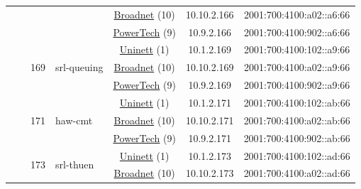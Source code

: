 \begin{small}
\begin{center}
\begin{longtable}{|c|c|c|c|c|c|c|c|}
  &  &  &  & \multicolumn{2}{|c|}{\tiny{\href{https://www.broadnet.no}{Broadnet} (10)}} & \tiny{10.10.2.166} & \tiny{2001:700:4100:a02::a6:66} \\* \cline{5-5}\cline{6-6}\cline{7-7}\cline{8-8}
  &  &  &  & \multicolumn{2}{|c|}{\tiny{\href{http://www.powertech.no}{PowerTech} (9)}} & \tiny{10.9.2.166} & \tiny{2001:700:4100:902::a6:66} \\* \cline{3-3}\cline{4-4}\cline{5-5}\cline{6-6}\cline{7-7}\cline{8-8}
  &  & \multirow{3}{*}{\tiny{169}} & \multicolumn{1}{|l|}{\multirow{3}{*}{\tiny{srl-queuing}}} & \multicolumn{2}{|c|}{\tiny{\href{https://www.uninett.no}{Uninett} (1)}} & \tiny{10.1.2.169} & \tiny{2001:700:4100:102::a9:66} \\* \cline{5-5}\cline{6-6}\cline{7-7}\cline{8-8}
  &  &  &  & \multicolumn{2}{|c|}{\tiny{\href{https://www.broadnet.no}{Broadnet} (10)}} & \tiny{10.10.2.169} & \tiny{2001:700:4100:a02::a9:66} \\* \cline{5-5}\cline{6-6}\cline{7-7}\cline{8-8}
  &  &  &  & \multicolumn{2}{|c|}{\tiny{\href{http://www.powertech.no}{PowerTech} (9)}} & \tiny{10.9.2.169} & \tiny{2001:700:4100:902::a9:66} \\* \cline{3-3}\cline{4-4}\cline{5-5}\cline{6-6}\cline{7-7}\cline{8-8}
  &  & \multirow{3}{*}{\tiny{171}} & \multicolumn{1}{|l|}{\multirow{3}{*}{\tiny{haw-cmt}}} & \multicolumn{2}{|c|}{\tiny{\href{https://www.uninett.no}{Uninett} (1)}} & \tiny{10.1.2.171} & \tiny{2001:700:4100:102::ab:66} \\* \cline{5-5}\cline{6-6}\cline{7-7}\cline{8-8}
  &  &  &  & \multicolumn{2}{|c|}{\tiny{\href{https://www.broadnet.no}{Broadnet} (10)}} & \tiny{10.10.2.171} & \tiny{2001:700:4100:a02::ab:66} \\* \cline{5-5}\cline{6-6}\cline{7-7}\cline{8-8}
  &  &  &  & \multicolumn{2}{|c|}{\tiny{\href{http://www.powertech.no}{PowerTech} (9)}} & \tiny{10.9.2.171} & \tiny{2001:700:4100:902::ab:66} \\* \cline{3-3}\cline{4-4}\cline{5-5}\cline{6-6}\cline{7-7}\cline{8-8}
  &  & \multirow{3}{*}{\tiny{173}} & \multicolumn{1}{|l|}{\multirow{3}{*}{\tiny{srl-thuen}}} & \multicolumn{2}{|c|}{\tiny{\href{https://www.uninett.no}{Uninett} (1)}} & \tiny{10.1.2.173} & \tiny{2001:700:4100:102::ad:66} \\* \cline{5-5}\cline{6-6}\cline{7-7}\cline{8-8}
  &  &  &  & \multicolumn{2}{|c|}{\tiny{\href{https://www.broadnet.no}{Broadnet} (10)}} & \tiny{10.10.2.173} & \tiny{2001:700:4100:a02::ad:66} \\* \cline{5-5}\cline{6-6}\cline{7-7}\cline{8-8}

\end{longtable}
\end{center}
\end{small}
